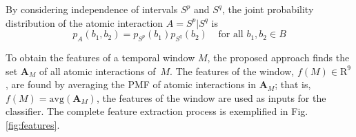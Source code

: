\documentclass[3p,times,preprint]{elsarticle}
\begin{document}
By considering independence of intervals $S^p$ and $S^q$, the joint probability distribution of the atomic interaction $A=S^p|S^q$ is%
\begin{equation}
p_A(b_1,b_2) = p_{S^p}(b_1)p_{S^q}(b_2) \;\;\;\; \text{for all  } b_1, b_2 \in B
\end{equation}

To obtain the features of a temporal window $M$, the proposed approach finds the set $\mathbf{A}_M$ of all atomic interactions \mbox{of $M$.} The features of the window, $f(M) \in \mathrm{R}^9$, are found by averaging the PMF of atomic interactions in $\mathbf{A}_M$; that is, $f(M) = \mathrm{avg} ( \mathbf{A}_M)$, the features of the window are used as inputs for the classifier. The complete feature extraction process is exemplified in Fig. \ref{fig:features}.

\newcommand{\MID}{\;\big\vert \;}
\end{document}
